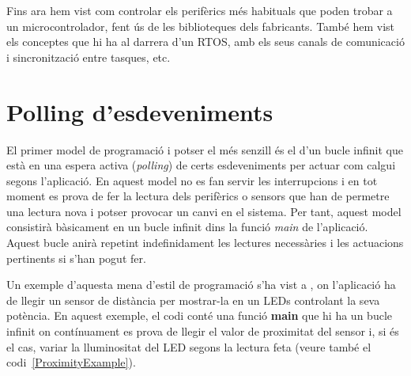 



Fins ara hem vist com controlar els perifèrics més habituals que poden trobar a un microcontrolador, fent ús de les biblioteques dels fabricants. També hem vist els conceptes que hi ha al darrera d'un RTOS, amb els seus canals de comunicació i sincronització entre tasques, etc.

\chapter{Polling d'esdeveniments}
El primer model de programació i potser el més senzill és el d'un bucle infinit que està en una espera activa ({\em polling}) de certs esdeveniments per actuar com calgui segons l'aplicació. En aquest model no es fan servir les interrupcions i en tot moment es prova de fer la lectura dels perifèrics o sensors que han de permetre una lectura nova i potser provocar un canvi en el sistema. Per tant, aquest model consistirà bàsicament en un bucle infinit dins la funció {\em main} de l'aplicació. Aquest bucle anirà repetint indefinidament les lectures necessàries i les actuacions pertinents si s'han pogut fer.

Un exemple d'aquesta mena d'estil de programació s'ha vist a , on l'aplicació ha de llegir un sensor de distància per mostrar-la en un LEDs controlant la seva potència. En aquest exemple, el codi conté una funció {\bf main} que hi ha un bucle infinit on contínuament es prova de llegir el valor de proximitat del sensor i, si és el cas, variar la lluminositat del LED segons la lectura feta (veure també el codi~\ref{ProximityExample}).

